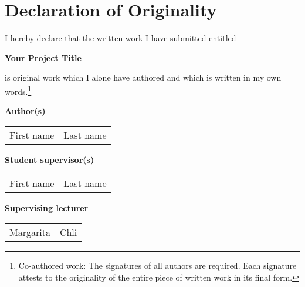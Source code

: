 
\section*{Declaration of Originality}

\vspace{1cm}

I hereby declare that the written work I have submitted entitled

\vspace{0.5cm}

\textbf{Your Project Title}

\vspace{0.5cm}

is original work which I alone have authored and which is written in my own words.\footnote{Co-authored work: The signatures of all authors are required. Each signature attests to the originality of the entire piece of written work in its final form.}

\vspace{1cm}

\textbf{Author(s)}

\vspace{0.5cm}

\begin{tabular}{ p{5cm} p{5cm} }
  First name & Last name \\
\end{tabular}

\vspace{0.5cm}

\textbf{Student supervisor(s)}

\vspace{0.5cm}

\begin{tabular}{ p{5cm} p{5cm} }
  First name & Last name \\
\end{tabular}

\vspace{0.5cm}

\textbf{Supervising lecturer}

\vspace{0.5cm}

\begin{tabular}{ p{5cm} p{5cm} }
  Margarita & Chli \\
\end{tabular}

